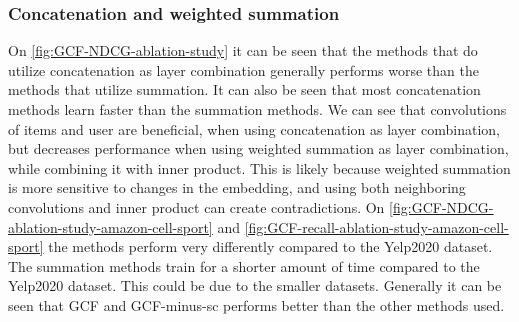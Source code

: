 \subsubsection{Concatenation and weighted summation}
On \autoref{fig:GCF-NDCG-ablation-study} it can be seen that the methods that do utilize concatenation as layer combination generally performs worse than the methods that utilize summation.
It can also be seen that most concatenation methods learn faster than the summation methods.
We can see that convolutions of items and user are beneficial, when using concatenation as layer combination, but decreases performance when using weighted summation as layer combination, while combining it with inner product. %
This is likely because weighted summation is more sensitive to changes in the embedding, and using both neighboring convolutions and inner product can create contradictions.
On \autoref{fig:GCF-NDCG-ablation-study-amazon-cell-sport} and \autoref{fig:GCF-recall-ablation-study-amazon-cell-sport} the methods perform very differently compared to the Yelp2020 dataset.
The summation methods train for a shorter amount of time compared to the Yelp2020 dataset.
This could be due to the smaller datasets.
Generally it can be seen that GCF and GCF-minus-sc performs better than the other methods used.

